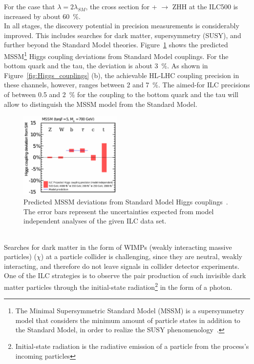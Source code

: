For the case that $\lambda = 2\lambda_{SM}$, the cross section for \positron + \electron $\rightarrow$ ZHH at the ILC500 is increased by about \SI{60}{\percent}.
\\In all stages, the discovery potential in precision measurements is considerably improved.
This includes searches for dark matter, supersymmetry (SUSY), and further beyond the Standard Model theories.
Figure~\ref{fig:MSSM_higgs_coupling} shows the predicted MSSM\footnote{The Minimal Supersymmetric Standard Model (MSSM) is a supersymmetry model that considers the minimum amount of particle states in addition to the Standard Model, in order to realize the SUSY phenomenology~\cite{MSSM}.} Higgs coupling deviations from Standard Model couplings.
For the bottom quark and the tau, the deviation is about \SI{3}{\percent}.
As shown in Figure~\ref{fig:Higgs_couplings} (b), the achievable HL-LHC coupling precision in these channels, however, ranges between 2 and \SI{7}{\percent}.
The aimed-for ILC precisions of between 0.5 and \SI{2}{\percent} for the coupling to the bottom quark and the tau will allow to distinguish the MSSM model from the Standard Model.
\begin{figure}
\centering
\includegraphics[width=0.45\textwidth]{Figures/MSSM_higgs_coupling.pdf}
\caption[Predicted MSSM deviations from SM Higgs couplings]{Predicted MSSM deviations from Standard Model Higgs couplings~\cite[p. 12]{ILCPhysics}.
The error bars represent the uncertainties expected from model independent analyses of the given ILC data set.}
\label{fig:MSSM_higgs_coupling}
\end{figure}
\\Searches for dark matter in the form of WIMPs (weakly interacting massive particles) ($\chi$) at a particle collider is challenging, since they are neutral, weakly interacting, and therefore do not leave signals in collider detector experiments.
One of the ILC strategies is to observe the pair production of such invisible dark matter particles through the initial-state radiation\footnote{Initial-state radiation is the radiative emission of a particle from the process's incoming particles} in the form of a photon.
